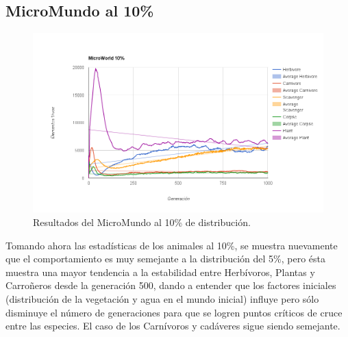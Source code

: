     \subsection{MicroMundo al 10\%}      
      \begin{figure}[h!]
        \centering
          \includegraphics[width=\textwidth]{./images/0_1.png}
          \caption{Resultados del MicroMundo al 10\% de distribución.} 
      \end{figure}      
      Tomando ahora las estadísticas de los animales al 10\%, se muestra nuevamente que el comportamiento es muy semejante a la distribución del 5\%, pero ésta muestra una mayor tendencia a la estabilidad entre Herbívoros, Plantas y Carroñeros desde la generación 500, dando a entender que los factores iniciales (distribución de la vegetación y agua en el mundo inicial) influye pero sólo disminuye el número de generaciones para que se logren puntos críticos de cruce entre las especies. El caso de los Carnívoros y cadáveres sigue siendo semejante.
    \linebreak
    \newpage
